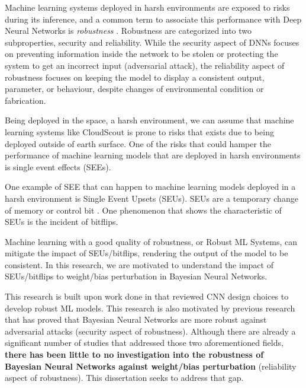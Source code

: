 Machine learning systems deployed in harsh environments are exposed to risks during its inference, and a common term to associate this performance with Deep Neural Networks is \textit{robustness} \cite{shafique_2021}. Robustness are categorized into two subproperties, security and reliability. While the security aspect of DNNs focuses on preventing information inside the network to be stolen or protecting the system to get an incorrect input (adversarial attack), the reliability aspect of robustness focuses on keeping the model to display a consistent output, parameter, or behaviour, despite changes of environmental condition or fabrication.


Being deployed in the space, a harsh environment, we can assume that machine learning systems like CloudScout is prone to risks that exists due to being deployed outside of earth surface. One of the risks that could hamper the performance of machine learning models that are deployed in harsh environments is single event effects (SEEs).

One example of SEE that can happen to machine learning models deployed in a harsh environment is Single Event Upsets (SEUs). SEUs are a temporary change of memory or control bit \cite{petersen_single_2011}. One phenomenon that shows the characteristic of SEUs is the incident of bitflips.

Machine learning with a good quality of robustness, or Robust ML Systems, can mitigate the impact of SEUs/bitflips, rendering the output of the model to be consistent. In this research, we are motivated to understand the impact of SEUs/bitflips to weight/bias perturbation in Bayesian Neural Networks. 

This research is built upon work done in \cite{dennispoperobustcnn} that reviewed CNN design choices to develop robust ML models. This research is also motivated by previous research that has proved that Bayesian Neural Networks are more robust against adversarial attacks (security aspect of robustness). Although there are already a significant number of studies that addressed those two aforementioned fields, \textbf{there has been little to no investigation into the robustness of Bayesian Neural Networks against weight/bias perturbation} (reliability aspect of robustness). This dissertation seeks to address that gap.


